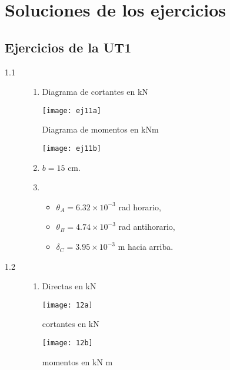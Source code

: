 
\chapter{Soluciones de los ejercicios}

\section{Ejercicios de la UT1}

\begin{description}
\item [1.1] 
\begin{enumerate}[label=\alph*)]
\item Diagrama de cortantes en kN

\begin{center}
	\texttt{[image: ej11a]}
\end{center}

Diagrama de momentos en kNm

\begin{center}
	\texttt{[image: ej11b]}
\end{center}

\item  $b = 15$ cm.
\item
\begin{itemize}
	\item $\theta_A = 6.32 \times 10^{-3}$ rad  horario,
	\item $\theta_B = 4.74 \times 10^{-3}$ rad antihorario,
	\item $\delta_C = 3.95 \times 10^{-3}$ m hacia arriba.
\end{itemize}

\end{enumerate}

\item[1.2] 

\begin{enumerate}[label=\alph*)]
	\item Directas en kN


\begin{center}
	\texttt{[image: 12a]}
\end{center}

cortantes en kN

\begin{center}
	\texttt{[image: 12b]}
\end{center}

momentos en kN m


\end{enumerate}
\end{description}
